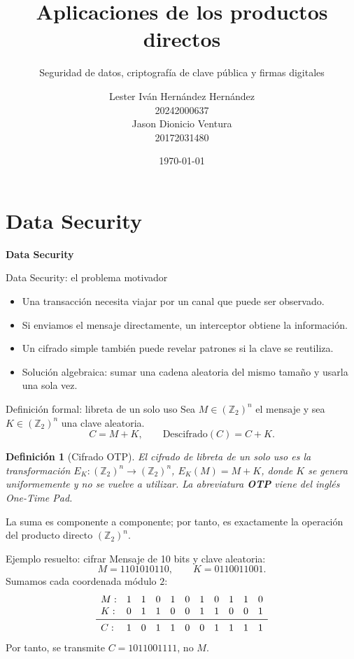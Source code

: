 \documentclass[aspectratio=169,11pt]{beamer}
\title[Aplicaciones de los productos directos]{Aplicaciones de los productos directos}
\subtitle{Seguridad de datos, criptografía de clave pública y firmas digitales}
\author[L. Hernández]{Lester Iván Hernández Hernández\\\small 20242000637\\[2mm]
Jason Dionicio Ventura\\\small 20172031480}
\institute[UNAH--Campus Cortés]{Estructuras Algebraicas I (MM-421)\\
Universidad Nacional Autónoma de Honduras (UNAH), Campus Cortés\\
Docente: Lic. Edwin Hernández}
\date{\today}
\newtheorem{definicion}{Definición}
\begin{document}
\begin{frame}
  \titlepage
\end{frame}

\section{Data Security}

\begin{frame}
  \centering
  \vfill
  {\LARGE\bfseries Data Security}
  \vfill
\end{frame}

\begin{frame}{Data Security: el problema motivador}
  \begin{itemize}
    \item Una transacción necesita viajar por un canal que puede ser observado.
    \item Si enviamos el mensaje directamente, un interceptor obtiene la información.
    \item Un cifrado simple también puede revelar patrones si la clave se reutiliza.
    \item Solución algebraica: sumar una cadena aleatoria del mismo tamaño y usarla una sola vez.
  \end{itemize}
\end{frame}

\begin{frame}{Definición formal: libreta de un solo uso}
  Sea $M\in(\mathbb Z_2)^n$ el mensaje y sea $K\in(\mathbb Z_2)^n$ una clave aleatoria.
  \[
    C=M+K,\qquad \text{Descifrado}(C)=C+K.
  \]
  \begin{definicion}[Cifrado OTP]
    El cifrado de libreta de un solo uso es la transformación
    $E_K:(\mathbb Z_2)^n\to(\mathbb Z_2)^n$, $E_K(M)=M+K$,
    donde $K$ se genera uniformemente y no se vuelve a utilizar. La abreviatura
    \textbf{OTP} viene del inglés \textit{One-Time Pad}.
  \end{definicion}
  La suma es componente a componente; por tanto, es exactamente la operación del producto directo $(\mathbb Z_2)^n$.
\end{frame}

\begin{frame}{Ejemplo resuelto: cifrar}
  Mensaje de 10 bits y clave aleatoria:
  \[
    M=1101010110,\qquad K=0110011001.
  \]
  Sumamos cada coordenada módulo $2$:
  \[
  \begin{array}{lrrrrrrrrrr}
  M:&1&1&0&1&0&1&0&1&1&0\\
  K:&0&1&1&0&0&1&1&0&0&1\\ \midrule
  C:&1&0&1&1&0&0&1&1&1&1
  \end{array}
  \]
  Por tanto, se transmite $C=1011001111$, no $M$.
\end{frame}
\end{document}
